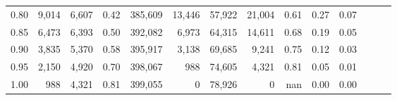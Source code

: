 \begin{tabular}{rrrrrrrrrrrrrr}
0.80 &   9,014 &  6,607 &  0.42 &  385,609 &   13,446 &  57,922 &  21,004 &  0.61 &  0.27 &      0.07 \\
0.85 &   6,473 &  6,393 &  0.50 &  392,082 &    6,973 &  64,315 &  14,611 &  0.68 &  0.19 &      0.05 \\
0.90 &   3,835 &  5,370 &  0.58 &  395,917 &    3,138 &  69,685 &   9,241 &  0.75 &  0.12 &      0.03 \\
0.95 &   2,150 &  4,920 &  0.70 &  398,067 &      988 &  74,605 &   4,321 &  0.81 &  0.05 &      0.01 \\
1.00 &     988 &  4,321 &  0.81 &  399,055 &        0 &  78,926 &       0 &   nan &  0.00 &      0.00 \\
\bottomrule
\end{tabular}
